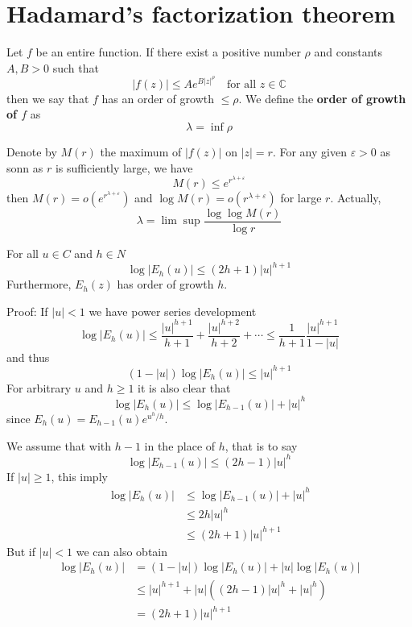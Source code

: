 \documentclass[12pt, oneside]{book}
\begin{document}
\section{Hadamard's factorization theorem}
\begin{definition}
    Let $f$ be an entire function. If there exist a positive number $\rho$ and constants $A,B>0$ such that
    $$\left|f(z)\right|
        \leq
        Ae^{B\left|z\right|^\rho}\quad\text{for all }z\in\mathbb{C}
    $$
    then we say that $f$ has an order of growth $\leq\rho$. We define the \textbf{order of growth of $f$} as
    $$
        \lambda = \inf\rho
    $$

    Denote by $M(r)$ the maximum of $\left|f(z)\right|$ on $\left|z\right|=r$.
    For any given $\varepsilon>0$ as sonn as $r$ is sufficiently large, we have
    $$
        M(r)\leq e^{r^{\lambda+\varepsilon}}
    $$
    then $M(r)=o(e^{r^{\lambda+\varepsilon}})$ and $\log M(r)=o(r^{\lambda+\varepsilon})$ for large $r$. Actually,
    $$\lambda=\lim\sup\frac{\log\log M(r)}{\log r}$$


\end{definition}
\begin{lemma}
    For all $u\in C$ and $h\in N$
    $$\log\left|E_h(u)\right|\leq(2h+1)\left|u\right|^{h+1}$$
    Furthermore, $E_h(z)$ has order of growth $h$.

    Proof: If $\left|u\right|<1$ we have power series development
    $$\log\left|E_{h}(u)\right|\leq\frac{\left|u\right|^{h+1}}{h+1}+\frac{\left|u\right|^{h+2}}{h+2}+\cdots\leq \frac{1}{h+1}\frac{\left|u\right|^{h+1}}{1-\left|u\right|}$$
    and thus
    $$(1-\left|u\right|)\log\left|E_h(u)\right|\leq\left|u\right|^{h+1}$$
    For arbitrary $u$ and $h\geq 1$ it is also clear that
    $$\log\left|E_h(u)\right|\leq\log\left|E_{h-1}(u)\right|+\left|u\right|^h$$
    since $E_h(u)=E_{h-1}(u)e^{u^h/h}$.

    We assume that with $h-1$ in the place of $h$, that is to say
    $$\log\left|E_{h-1}(u)\right|\leq(2h-1)\left|u\right|^{h}$$
    If $\left|u \right|\geq 1$, this imply
    $$\begin{aligned}
            \log\left|E_{h}(u)\right| &
            \leq\log\left|E_{h-1}(u)\right|+\left|u\right|^h            \\
                                      & \leq2h\left|u\right|^h          \\
                                      & \leq (2h+1)\left|u\right|^{h+1}
        \end{aligned}
    $$
    But if $\left|u\right|<1$ we can also obtain
    $$\begin{aligned}
            \log\left|E_{h}(u)\right| &
            =(1-\left|u\right|)\log\left|E_h(u)\right|+\left|u\right|\log\left|E_h(u)\right|                             \\
                                      & \leq\left|u\right|^{h+1}+\left|u\right|((2h-1)\left|u\right|^h+\left|u\right|^h) \\
                                      & =(2h+1)\left|u\right|^{h+1}
        \end{aligned}
    $$
\end{lemma}
\end{document}
